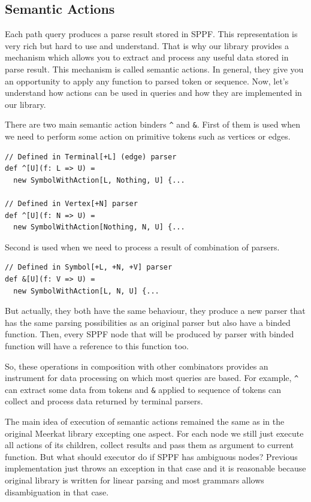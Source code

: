 \subsection{Semantic Actions}
\label{sec:semanticActions}
Each path query produces a parse result stored in SPPF.
This representation is very rich but hard to use and understand.
That is why our library provides a mechanism which allows you to extract and process any useful data stored in parse result.
This mechanism is called semantic actions.
In general, they give you an opportunity to apply any function to parsed token or sequence.
Now, let's understand how actions can be used in queries and how they are implemented in our library.

There are two main semantic action binders \lstinline{^} and \lstinline{&}.
First of them is used when we need to perform some action on primitive tokens such as vertices or edges.
\begin{lstlisting}
// Defined in Terminal[+L] (edge) parser
def ^[U](f: L => U) = 
  new SymbolWithAction[L, Nothing, U] {...
  
// Defined in Vertex[+N] parser
def ^[U](f: N => U) = 
  new SymbolWithAction[Nothing, N, U] {...
\end{lstlisting}

Second is used when we need to process a result of combination of parsers.
\begin{lstlisting}
// Defined in Symbol[+L, +N, +V] parser
def &[U](f: V => U) = 
  new SymbolWithAction[L, N, U] {...
\end{lstlisting}

But actually, they both have the same behaviour, they produce a new parser that has the same parsing possibilities as an original parser but also have a binded function.
Then, every SPPF node that will be produced by parser with binded function will have a reference to this function too.

So, these operations in composition with other combinators provides an instrument for data processing on which most queries are based. 
For example, \lstinline{^} can extract some data from tokens and \lstinline{&} applied to sequence of tokens can collect and process data returned by terminal parsers.

The main idea of execution of semantic actions remained the same as in the original Meerkat library excepting one aspect.
For each node we still just execute all actions of its children, collect results and pass them as argument to current function.
But what should executor do if SPPF has ambiguous nodes? 
Previous implementation just throws an exception in that case and it is reasonable because original library is written for linear parsing and most grammars allows disambiguation in that case.


